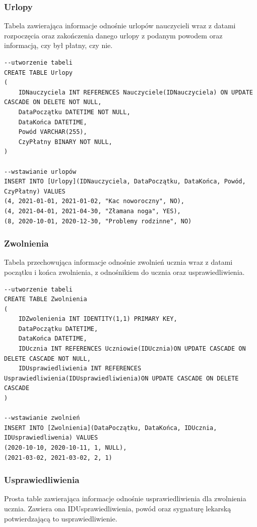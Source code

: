 \documentclass[60pt]{article}
\begin{document}
 \subsubsection{Urlopy}
Tabela zawierająca informacje odnośnie urlopów nauczycieli wraz z datami rozpoczęcia oraz zakończenia danego urlopy z podanym powodem oraz informacją, czy był płatny, czy nie.

\begin{verbatim}
--utworzenie tabeli
CREATE TABLE Urlopy
(
	IDNauczyciela INT REFERENCES Nauczyciele(IDNauczyciela) ON UPDATE CASCADE ON DELETE NOT NULL,
	DataPoczątku DATETIME NOT NULL,
	DataKońca DATETIME,
	Powód VARCHAR(255),
	CzyPłatny BINARY NOT NULL,
)

--wstawianie urlopów
INSERT INTO [Urlopy](IDNauczyciela, DataPoczątku, DataKońca, Powód, CzyPłatny) VALUES
(4, 2021-01-01, 2021-01-02, "Kac noworoczny", NO),
(4, 2021-04-01, 2021-04-30, "Złamana noga", YES),
(8, 2020-10-01, 2020-12-30, "Problemy rodzinne", NO)
\end{verbatim}

 \subsubsection{Zwolnienia}
Tabela przechowująca informacje odnośnie zwolnień ucznia wraz z datami początku i końca zwolnienia, z odnośnikiem do ucznia oraz usprawiedliwienia.

\begin{verbatim}
--utworzenie tabeli
CREATE TABLE Zwolnienia
(
	IDZwolenienia INT IDENTITY(1,1) PRIMARY KEY,
	DataPoczątku DATETIME,
	DataKońca DATETIME,
	IDUcznia INT REFERENCES Uczniowie(IDUcznia)ON UPDATE CASCADE ON DELETE CASCADE NOT NULL,
	IDUsprawiedliwienia INT REFERENCES Usprawiedliwienia(IDUsprawiedliwienia)ON UPDATE CASCADE ON DELETE CASCADE
)

--wstawianie zwolnień
INSERT INTO [Zwolnienia](DataPoczątku, DataKońca, IDUcznia, IDUsprawiedliwenia) VALUES
(2020-10-10, 2020-10-11, 1, NULL),
(2021-03-02, 2021-03-02, 2, 1)
\end{verbatim}

\subsubsection{Usprawiedliwienia}
Prosta table zawierająca informacje odnośnie usprawiedliwienia dla zwolnienia ucznia. Zawiera ona IDUsprawiedliwienia, powód oraz sygnaturę lekarską potwierdzającą to usprawiedliwienie.
\end{document}
